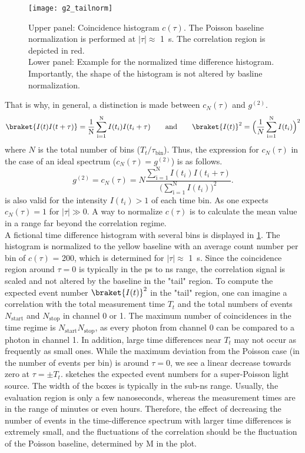 \begin{figure}[htp]
	\centering
	\texttt{[image: g2\_tailnorm]}
	\caption{Upper panel: Coincidence histogram $c(\tau)$. The Poisson baseline normalization is performed at $|\tau|\approx$ \SI{1}{\s}. The correlation region is depicted in red.\\
		Lower panel: Example for the normalized time difference histogram. Importantly, the shape of the histogram is not altered by basline normalization. }
	\label{fig:tailnorm}
\end{figure}
\noindent That is why, in general, a distinction is made between $c_N(\tau)$ and $g^{(2)}$.
\begin{equation}\label{eq:g2finite2}
	\braket{I(t)I(t+\tau)}=\dfrac{1}{\mathrm{N}}\sum_\mathrm{i=1}^\mathrm{N}I(t_i)I(t_i+\tau)\qquad \textrm{and}\qquad \braket{I(t)}^2=\Big(\dfrac{1}{N}\sum_\mathrm{i=1}^\mathrm{N} I(t_i)\Big)^2
\end{equation}
where $N$ is the total number of bins ($T_t/\tau_\mathrm{bin}$). Thus, the expression for $c_N(\tau)$ in the case of an ideal spectrum ($c_N(\tau)=g^{(2)}$) is as follows.
\begin{equation}\label{eq:g2finite4}
	g^{(2)}=c_N(\tau)=N\dfrac{\sum_\mathrm{i=1}^\mathrm{N} I(t_i)I(t_i+\tau)}{\Big(\sum_\mathrm{i=1}^\mathrm{N} I(t_i)\Big)^2}.
\end{equation}
 is also valid for the intensity $I(t_i)> 1$ of each time bin. As one expects $c_N(\tau) = 1$ for $|\tau|\gg 0$. A way to normalize $c(\tau)$ is to calculate the mean value in a range far beyond the correlation regime.\\
A fictional time difference histogram with several bins is displayed in \cref{fig:tailnorm}. The histogram is normalized to the yellow baseline with an average count number per bin of $c(\tau)$ = \num{200}, which is determined for $|\tau|\approx$ \SI{1}{\s}. Since the coincidence region around $\tau=0$ is typically in the \si{ps} to \si{ns} range, the correlation signal is scaled and not altered by the baseline in the "tail" region.
To compute the expected event number $\braket{I(t)}^2$ in the "tail" region, one can imagine a correlation with the total measurement time $T_t$ and the total numbers of events $N_\mathrm{start}$ and $N_\mathrm{stop}$ in channel \num{0} or \num{1}. The maximum number of coincidences in the time regime is $N_\mathrm{start}N_\mathrm{stop}$, as every photon from channel \num{0} can be compared to a photon in channel \num{1}. In addition, large time differences near $T_t$ may not occur as frequently as small ones. While the maximum deviation from the Poisson case (in the number of events per bin) is around $\tau=0$, we see a linear decrease towards zero at $ \tau= \pm T_t$.  sketches the expected event numbers for a super-Poisson light source. The width of the boxes is typically in the sub-\si{\ns} range. Usually, the evaluation region is only a few nanoseconds, whereas the measurement times are in the range of minutes or even hours. Therefore, the effect of decreasing the number of events in the time-difference spectrum with larger time differences is extremely small, and the fluctuations of the correlation should be the fluctuation of the Poisson baseline, determined by M in the plot.
